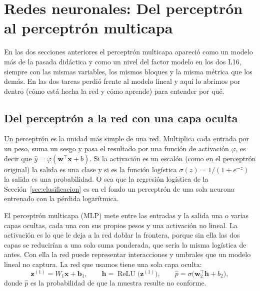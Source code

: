 \section{Redes neuronales: Del perceptrón al perceptrón multicapa}
\label{sec:redes}

En las dos secciones anteriores el perceptrón multicapa apareció como un
modelo más de la pasada didáctica y como un nivel del factor modelo en los
dos L16, siempre con las mismas variables, los mismos bloques y la misma
métrica que los demás. En las dos tareas perdió frente al modelo lineal y
aquí lo abrimos por dentro (cómo está hecha la red y cómo aprende) para
entender por qué.

\subsection{Del perceptrón a la red con una capa oculta}

Un perceptrón es la unidad más simple de una red. Multiplica cada entrada
por un peso, suma un sesgo y pasa el resultado por una función de activación
$\varphi$, es decir que $\hat{y}=\varphi(\mathbf{w}^\top\mathbf{x}+b)$. Si la
activación es un escalón (como en el perceptrón original) la salida es una
clase y si es la función logística $\sigma(z)=1/(1+e^{-z})$ la salida es una
probabilidad. O sea que la regresión logística de la
Sección~\ref{sec:clasificacion} es en el fondo un perceptrón de una sola
neurona entrenado con la pérdida logarítmica.

El perceptrón multicapa (MLP) mete entre las entradas y la salida una o
varias capas ocultas, cada una con sus propios pesos y una activación no
lineal. La activación es lo que le deja a la red doblar la frontera, porque
sin ella las dos capas se reducirían a una sola suma ponderada, que sería la
misma logística de antes. Con ella la red puede representar interacciones y
umbrales que un modelo lineal no captura. La red que usamos tiene una sola
capa oculta:
\begin{equation}
\mathbf{z}^{(1)}=W_1\mathbf{x}+\mathbf{b}_1,\qquad
\mathbf{h}=\operatorname{ReLU}\!\big(\mathbf{z}^{(1)}\big),\qquad
\hat{p}=\sigma\!\big(\mathbf{w}_2^\top\mathbf{h}+b_2\big),
\label{eq:mlp}
\end{equation}
donde $\hat{p}$ es la probabilidad de que la muestra resulte no conforme.

